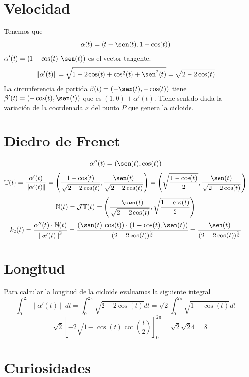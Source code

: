 \documentclass{article}
\newcommand{\bb}[1]{\mathbb{#1}}
\begin{document}
\section{Velocidad}
Tenemos que
$$
\alpha(t) = (t- \sen(t),1-\cos(t))
$$
$\alpha'(t) = (1-\cos(t),\sen(t))$ es el vector tangente.
$$
\left\| \alpha'(t) \right\| = \sqrt{1-2\cos(t)+\cos^2(t)+\sen^2(t)}=\sqrt{2-2\cos(t)}
$$
La circunferencia de partida $\beta(t)=(-\sen(t),-\cos(t))$ tiene $\beta'(t)=(-\cos(t),\sen(t))$ que es $(1,0)+\alpha'(t)$.
Tiene sentido dada la variación de la coordenada $x$ del punto $P$ que genera la cicloide.
\section{Diedro de Frenet}
$$
\alpha''(t)=(\sen(t),\cos(t))
$$
$$
\bb{T}(t)=\frac{\alpha'(t)}{\left\| \alpha'(t)  \right\|} = \left( \frac{1-\cos(t)}{\sqrt{2-2\cos(t)}},\frac{\sen(t)}{\sqrt{2-2\cos(t)}} \right)
= \left( \sqrt{\frac{1-\cos(t)}{2}} , \frac{\sen(t)}{\sqrt{2-2\cos(t)}} \right)
$$
$$
\bb{N}(t) = \mathcal{J}\bb{T}(t)= \left( \frac{-\sen(t)}{\sqrt{2-2\cos(t)}}, \sqrt{\frac{1-\cos(t)}{2}}\right)
$$
$$
k_2(t)=\frac{\alpha''(t)\cdot\bb{N}(t)}{\left\| \alpha'(t) \right\|^2}
=\frac{(\sen(t),\cos(t))\cdot(1-\cos(t),\sen(t))}{(2-2\cos(t))^{\frac{3}{2}}}
=\frac{\sen(t)}{(2-2\cos(t))^{\frac{3}{2}}}
$$
\section{Longitud}
Para calcular la longitud de la cicloide evaluamos la siguiente integral
$$
\int_0^{2\pi} \left\| \alpha'(t) \right\| dt = \int_0^{2\pi} \sqrt{2-2\cos(t)} dt =\sqrt{2} \int_0^{2\pi} \sqrt{1-\cos(t)} dt
$$
$$
= \sqrt{2}\left[ -2 \sqrt{1-\cos(t)}\cot\left(\frac{t}{2}\right)\right]_0^{2\pi} = \sqrt{2}\sqrt{2}4=8
$$
\section{Curiosidades}
\end{document}
